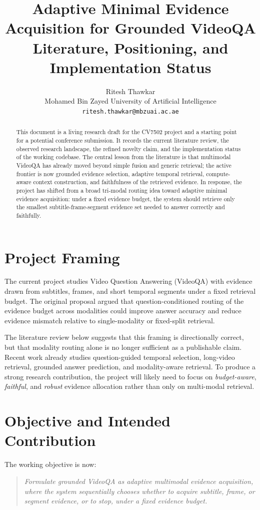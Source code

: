 \documentclass{article}
\title{Adaptive Minimal Evidence Acquisition for Grounded VideoQA \\ \large Literature, Positioning, and Implementation Status}
\author{
  Ritesh Thawkar \\
  Mohamed Bin Zayed University of Artificial Intelligence \\
  \texttt{ritesh.thawkar@mbzuai.ac.ae}
}
\begin{document}
\maketitle

\begin{abstract}
This document is a living research draft for the CV7502 project and a starting point for a potential conference submission.
It records the current literature review, the observed research landscape, the refined novelty claim, and the implementation status of the working codebase.
The central lesson from the literature is that multimodal VideoQA has already moved beyond simple fusion and generic retrieval; the active frontier is now grounded evidence selection, adaptive temporal retrieval, compute-aware context construction, and faithfulness of the retrieved evidence.
In response, the project has shifted from a broad tri-modal routing idea toward adaptive minimal evidence acquisition: under a fixed evidence budget, the system should retrieve only the smallest subtitle-frame-segment evidence set needed to answer correctly and faithfully.
\end{abstract}

\section{Project Framing}
The current project studies Video Question Answering (VideoQA) with evidence drawn from subtitles, frames, and short temporal segments under a fixed retrieval budget.
The original proposal argued that question-conditioned routing of the evidence budget across modalities could improve answer accuracy and reduce evidence mismatch relative to single-modality or fixed-split retrieval.

The literature review below suggests that this framing is directionally correct, but that modality routing alone is no longer sufficient as a publishable claim.
Recent work already studies question-guided temporal selection, long-video retrieval, grounded answer prediction, and modality-aware retrieval.
To produce a strong research contribution, the project will likely need to focus on \emph{budget-aware}, \emph{faithful}, and \emph{robust} evidence allocation rather than only on multi-modal retrieval.

\section{Objective and Intended Contribution}
The working objective is now:
\begin{quote}
\emph{Formulate grounded VideoQA as adaptive multimodal evidence acquisition, where the system sequentially chooses whether to acquire subtitle, frame, or segment evidence, or to stop, under a fixed evidence budget.}
\end{quote}
\end{document}
